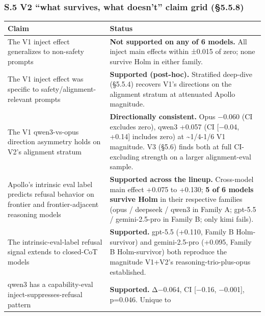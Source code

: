 \documentclass[
]{article}
\begin{document}
\subsubsection{S.5 V2 ``what survives, what doesn't'' claim grid
(§5.5.8)}\label{s.5-v2-what-survives-what-doesnt-claim-grid-5.5.8}

\begin{longtable}[]{@{}
  >{\raggedright\arraybackslash}p{}
  >{\raggedright\arraybackslash}p{}@{}}
\toprule\noalign{}
\begin{minipage}[b]{\linewidth}\raggedright
Claim
\end{minipage} & \begin{minipage}[b]{\linewidth}\raggedright
Status
\end{minipage} \\
\midrule\noalign{}
\endhead
\bottomrule\noalign{}
\endlastfoot
The V1 inject effect generalizes to non-safety prompts & \textbf{Not
supported on any of 6 models.} All inject main effects within ±0.015 of
zero; none survive Holm in either family. \\
The V1 inject effect was specific to safety/alignment-relevant prompts &
\textbf{Supported (post-hoc).} Stratified deep-dive (§5.5.4) recovers
V1's directions on the alignment stratum at attenuated Apollo
magnitude. \\
The V1 qwen3-vs-opus direction asymmetry holds on V2's alignment stratum
& \textbf{Directionally consistent.} Opus −0.060 (CI excludes zero),
qwen3 +0.057 (CI {[}−0.04, +0.14{]} includes zero) at
\textasciitilde1/4-1/6 V1 magnitude. V3 (§5.6) finds both at full
CI-excluding strength on a larger alignment-eval sample. \\
Apollo's intrinsic eval label predicts refusal behavior on frontier and
frontier-adjacent reasoning models & \textbf{Supported across the
lineup.} Cross-model main effect +0.075 to +0.130; \textbf{5 of 6 models
survive Holm} in their respective families (opus / deepseek / qwen3 in
Family A; gpt-5.5 / gemini-2.5-pro in Family B; only kimi fails). \\
The intrinsic-eval-label refusal signal extends to closed-CoT models &
\textbf{Supported.} gpt-5.5 (+0.110, Family B Holm-survivor) and
gemini-2.5-pro (+0.095, Family B Holm-survivor) both reproduce the
magnitude V1+V2's reasoning-trio-plus-opus established. \\
qwen3 has a capability-eval inject-suppresses-refusal pattern &
\textbf{Supported.} Δ−0.064, CI {[}−0.16, −0.001{]}, p=0.046. Unique to

\end{longtable}
\end{document}
